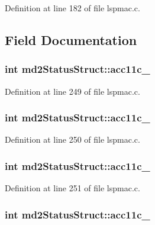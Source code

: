 Definition at line 182 of file lspmac.c.

\subsection{Field Documentation}
\hypertarget{structmd2StatusStruct_a69fc2e30a5de0a11c992d133e7a761cd}{
\subsubsection[{acc11c\_\-1}]{\setlength{\rightskip}{0pt plus 5cm}int {\bf md2StatusStruct::acc11c\_}}}
\label{structmd2StatusStruct_a69fc2e30a5de0a11c992d133e7a761cd}


Definition at line 249 of file lspmac.c.\hypertarget{structmd2StatusStruct_ad186f06cb4670b00b8af8264d1da66a4}{
\subsubsection[{acc11c\_\-2}]{\setlength{\rightskip}{0pt plus 5cm}int {\bf md2StatusStruct::acc11c\_}}}
\label{structmd2StatusStruct_ad186f06cb4670b00b8af8264d1da66a4}


Definition at line 250 of file lspmac.c.\hypertarget{structmd2StatusStruct_a20a15620e12888f61c0aed1e47e97932}{
\subsubsection[{acc11c\_\-3}]{\setlength{\rightskip}{0pt plus 5cm}int {\bf md2StatusStruct::acc11c\_}}}
\label{structmd2StatusStruct_a20a15620e12888f61c0aed1e47e97932}


Definition at line 251 of file lspmac.c.\hypertarget{structmd2StatusStruct_ab09c1342dc12052b8f5b35f78ef95000}{
\subsubsection[{acc11c\_\-5}]{\setlength{\rightskip}{0pt plus 5cm}int {\bf md2StatusStruct::acc11c\_}}}
\label{structmd2StatusStruct_ab09c1342dc12052b8f5b35f78ef95000}


